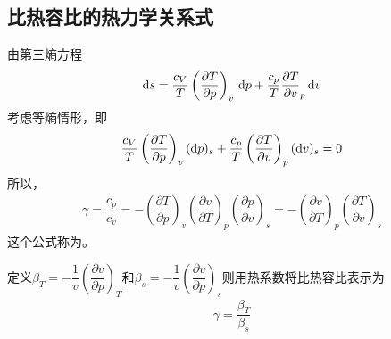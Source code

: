 \subsection{比热容比的热力学关系式}
由第三熵方程
\begin{align*}
	{\rm{d}} s = \dfrac{c_V}{T}\left(\dfrac{\partial T}{\partial p}\right)_v \, {\rm{d}} p + \dfrac{c_p}{T}\dfrac{\partial T}{\partial v}_p \, {\rm{d}} v
\end{align*}
考虑等熵情形，即
\begin{align*}
	\dfrac{c_V}{T} \left(\dfrac{\partial T}{\partial p}\right)_v ({\rm{d}} p)_s + \dfrac{c_p}{T}\left(\dfrac{\partial T}{\partial v}\right)_p ({\rm{d}} v)_s =0
\end{align*}
所以，
\begin{align}
	\gamma = \dfrac{c_p}{c_v} = - \left(\dfrac{\partial T}{\partial p}\right)_v \left(\dfrac{\partial v}{\partial T}\right)_p \left(\dfrac{\partial p}{\partial v}\right)_s = - \left(\dfrac{\partial v}{\partial T}\right)_p \left(\dfrac{\partial T}{\partial v}\right)_s
\end{align}
这个公式称为。
\vspace*{0.5em}

定义$\beta_T = -\dfrac{1}{v}\left(\dfrac{\partial v}{\partial p}\right)_T$和$\beta_s = -\dfrac{1}{v}\left(\dfrac{\partial v}{\partial p}\right)_s$则用热系数将比热容比表示为
\begin{align}
	\gamma = \dfrac{\beta_T}{\beta_s}
\end{align}











